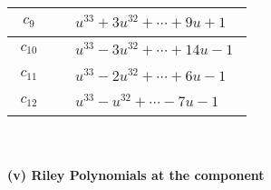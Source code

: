 \documentclass[1p]{elsarticle_modified}
\theoremstyle{definition}
\begin{document}
\begin{tabular}{m{50pt}|m{274pt}}
\hline $$\begin{aligned}c_{9}\end{aligned}$$&$\begin{aligned}
&u^{33}+3 u^{32}+\cdots+9 u+1
\end{aligned}$\\
\hline $$\begin{aligned}c_{10}\end{aligned}$$&$\begin{aligned}
&u^{33}-3 u^{32}+\cdots+14 u-1
\end{aligned}$\\
\hline $$\begin{aligned}c_{11}\end{aligned}$$&$\begin{aligned}
&u^{33}-2 u^{32}+\cdots+6 u-1
\end{aligned}$\\
\hline $$\begin{aligned}c_{12}\end{aligned}$$&$\begin{aligned}
&u^{33}- u^{32}+\cdots-7 u-1
\end{aligned}$\\
\hline
\end{tabular}\\~\\
\newpage\renewcommand{\arraystretch}{1}
\flushleft \textbf{(v) Riley Polynomials at the component}\newline \\
\end{document}
